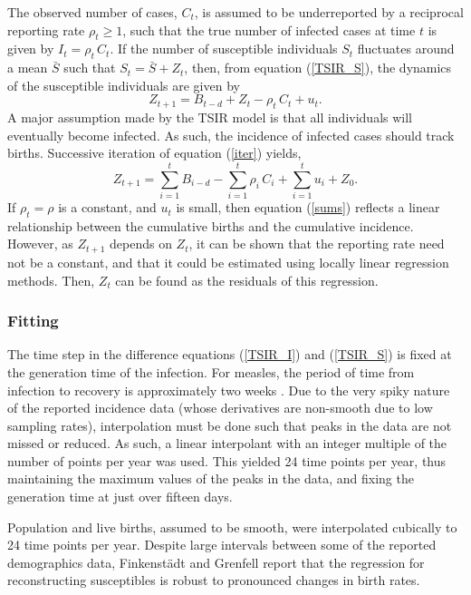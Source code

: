 \documentclass[10pt]{article}
\begin{document}
The observed number of cases, $C_t$, is assumed to be underreported by a reciprocal reporting rate $\rho_t \ge 1$, such that the true number of infected cases at time $t$ is given by $I_t = \rho_t \,C_t$. If the number of susceptible individuals $S_t$ fluctuates around a mean $\bar{S}$ such that $S_t = \bar{S} + Z_t$, then, from equation (\ref{TSIR_S}), the dynamics of the susceptible individuals are given by
\begin{equation}
Z_{t+1} = B_{t-d} + Z_{t} - \rho_t\,C_t + u_t.
\label{iter}
\end{equation}
A major assumption made by the TSIR model is that all individuals will eventually become infected. As such, the incidence of infected cases should track births. Successive iteration of equation (\ref{iter}) yields,
\begin{equation}
Z_{t+1} = \sum_{i=1}^t B_{i-d} - \sum_{i=1}^t \rho_i \, C_i + \sum_{i=1}^t u_i + Z_0.
\label{sums}
\end{equation}
If $\rho_t = \rho$ is a constant, and $u_t$ is small, then equation (\ref{sums}) reflects a linear relationship between the cumulative births and the cumulative incidence. However, as $Z_{t+1}$ depends on $Z_t$, it can be shown that the reporting rate need not be a constant, and that it could be estimated using locally linear regression methods. Then, $Z_t$ can be found as the residuals of this regression. 






\subsubsection*{Fitting}

The time step in the difference equations (\ref{TSIR_I}) and (\ref{TSIR_S}) is fixed at the generation time of the infection. For measles, the period of time from infection to recovery is approximately two weeks \cite{Anderson1991}. Due to the very spiky nature of the reported incidence data (whose derivatives are non-smooth due to low sampling rates), interpolation must be done such that peaks in the data are not missed or reduced. As such, a linear interpolant with an integer multiple of the number of points per year was used. This yielded 24 time points per year, thus maintaining the maximum values of the peaks in the data, and fixing the generation time at just over fifteen days.

Population and live births, assumed to be smooth, were interpolated cubically to 24 time points per year. Despite large intervals between some of the reported demographics data, Finkenst\"{a}dt and Grenfell \cite{Finkenstadt2000} report that the regression for reconstructing susceptibles is robust to pronounced changes in birth rates.
\end{document}
